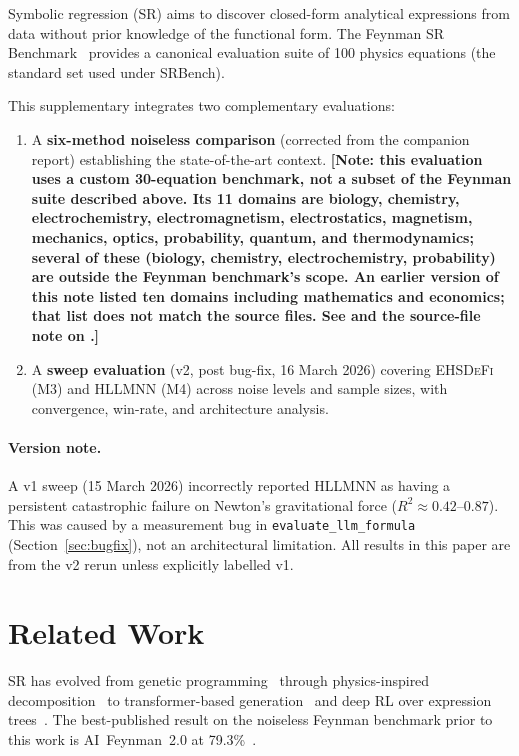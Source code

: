 \documentclass[twoside,11pt]{article}
\newcommand{\EHD}{\textsc{EHSDeFi}}
\newcommand{\HSL}{\textsc{HLLMNN}}
\newcommand{\Rsq}{R^{2}}
\begin{document}
Symbolic regression (SR) aims to discover closed-form analytical expressions
from data without prior knowledge of the functional form.  The Feynman SR
Benchmark~\citep{udrescu2020ai} provides a canonical evaluation suite of
100 physics equations (the standard set used under SRBench).

This supplementary integrates two complementary evaluations:
\begin{enumerate}
  \item A \textbf{six-method noiseless comparison} (corrected from the
    companion report) establishing the state-of-the-art context. \textbf{[Note:
    this evaluation uses a custom 30-equation benchmark, not a subset of the
    Feynman suite described above. Its 11 domains are biology, chemistry,
    electrochemistry, electromagnetism, electrostatics, magnetism, mechanics,
    optics, probability, quantum, and thermodynamics; several of these
    (biology, chemistry, electrochemistry, probability) are outside the
    Feynman benchmark's scope. An earlier version of this note listed ten
    domains including mathematics and economics; that list does not match
    the source files. See
     and the source-file note on .]}
  \item A \textbf{sweep evaluation} (v2, post bug-fix, 16 March 2026)
    covering \EHD{} (M3) and \HSL{} (M4) across noise levels and sample
    sizes, with convergence, win-rate, and architecture analysis.
\end{enumerate}

\paragraph{Version note.}
A v1 sweep (15 March 2026) incorrectly reported \HSL{} as having a persistent
catastrophic failure on Newton's gravitational force ($\Rsq \approx 0.42$--$0.87$).
This was caused by a measurement bug in \texttt{evaluate\_llm\_formula}
(Section~\ref{sec:bugfix}), not an architectural limitation.  All results in
this paper are from the v2 rerun unless explicitly labelled v1.

\section{Related Work}
\label{suppb:related}

SR has evolved from genetic programming~\citep{schmidt2009distilling} through
physics-inspired decomposition~\citep{udrescu2020ai} to transformer-based
generation~\citep{biggio2021neural,shojaee2023transformer} and deep RL over
expression trees~\citep{petersen2021deep}.  The best-published result on the
noiseless Feynman benchmark prior to this work is AI~Feynman~2.0 at
79.3\%~\citep{udrescu2020aifeynman2}.
\end{document}
